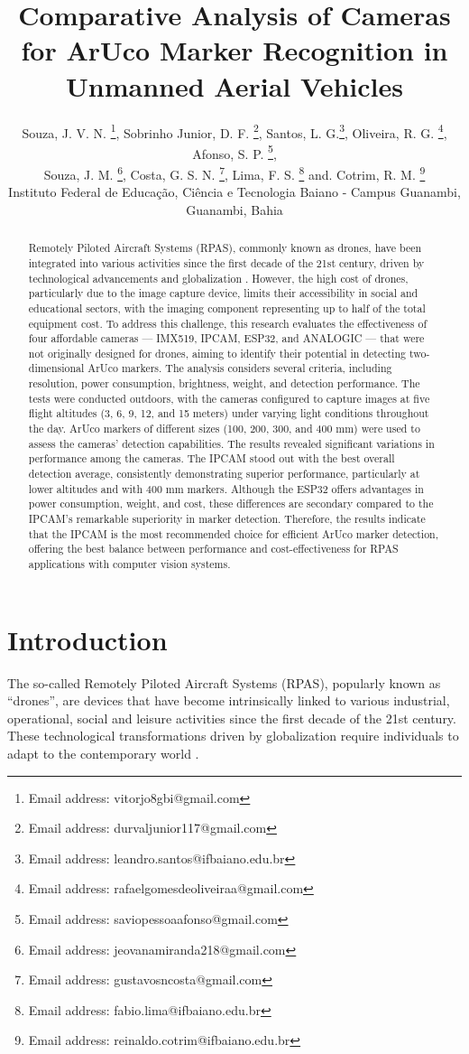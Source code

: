 \documentclass[letterpaper]{article}
\title{Comparative Analysis of Cameras for ArUco Marker Recognition in Unmanned Aerial Vehicles}
\author{Souza, J. V. N. \thanks{Email address: vitorjo8gbi@gmail.com}, Sobrinho Junior, D. F. \thanks{Email address: durvaljunior117@gmail.com}, Santos, L. G.\thanks{Email address: leandro.santos@ifbaiano.edu.br}, Oliveira, R. G. \thanks{Email address: rafaelgomesdeoliveiraa@gmail.com}, Afonso, S. P. \thanks{Email address: saviopessoaafonso@gmail.com}, \\ Souza, J. M. \thanks{Email address: jeovanamiranda218@gmail.com}, Costa, G. S. N. \thanks{Email address: gustavosncosta@gmail.com}, Lima, F. S. \thanks{Email address: fabio.lima@ifbaiano.edu.br} and. Cotrim, R. M. \thanks{Email address: reinaldo.cotrim@ifbaiano.edu.br} \\ Instituto Federal de Educação, Ciência e Tecnologia Baiano - Campus Guanambi, Guanambi, Bahia}
\begin{document}
\maketitle
\thispagestyle{empty} %

\begin{abstract}
Remotely Piloted Aircraft Systems (RPAS), commonly known as drones, have been integrated into various activities since the first decade of the 21st century, driven by technological advancements and globalization \cite{silva2017steam}. However, the high cost of drones, particularly due to the image capture device, limits their accessibility in social and educational sectors, with the imaging component representing up to half of the total equipment cost. To address this challenge, this research evaluates the effectiveness of four affordable cameras — IMX519, IPCAM, ESP32, and ANALOGIC — that were not originally designed for drones, aiming to identify their potential in detecting two-dimensional ArUco markers. The analysis considers several criteria, including resolution, power consumption, brightness, weight, and detection performance. The tests were conducted outdoors, with the cameras configured to capture images at five flight altitudes (3, 6, 9, 12, and 15 meters) under varying light conditions throughout the day. ArUco markers of different sizes (100, 200, 300, and 400 mm) were used to assess the cameras' detection capabilities. The results revealed significant variations in performance among the cameras. The IPCAM stood out with the best overall detection average, consistently demonstrating superior performance, particularly at lower altitudes and with 400 mm markers. Although the ESP32 offers advantages in power consumption, weight, and cost, these differences are secondary compared to the IPCAM's remarkable superiority in marker detection. Therefore, the results indicate that the IPCAM is the most recommended choice for efficient ArUco marker detection, offering the best balance between performance and cost-effectiveness for RPAS applications with computer vision systems.
\end{abstract}
\section{Introduction} \label{section:introduction}
The so-called Remotely Piloted Aircraft Systems (RPAS), popularly known as “drones”, are devices that have become intrinsically linked to various industrial, operational, social and leisure activities since the first decade of the 21st century. These technological transformations driven by globalization require individuals to adapt to the contemporary world \cite{silva2017steam}. %
\end{document}

